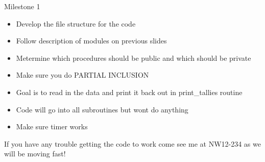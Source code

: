\documentclass{beamer}
\begin{document}
\begin{frame}{Milestone 1}

  \begin{itemize}
    \item Develop the file structure for the code
    \vfill\item Follow description of modules on previous slides
    \vfill\item Metermine which procedures should be public and which should be private
    \vfill\item Make sure you do PARTIAL INCLUSION
    \vfill\item Goal is to read in the data and print it back out in print\_tallies routine
    \vfill\item Code will go into all subroutines but wont do anything
    \vfill\item Make sure timer works
  \end{itemize}
  \vfill
  \alert{If you have any trouble getting the code to work come see me at NW12-234 as we will be moving fast!}

\end{frame}
\end{document}
